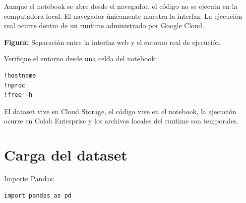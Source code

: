 \documentclass[
  coursetitle={Cómputo Nube y Tecnologías Emergentes},
  coursehours={96},
  coursedate={Verano 2026},
  doctype={Tutorial},
  otherlangs={english,french},
  authorname={Lázaro},
  authorsurname={Bustio-Martínez},
  authortitle={PhD},
  role={Profesor Investigador},
  email={lbustio@inaoe.mx},
  phone={5559504000},
  ext={7459},
  institution={Instituto Nacional de Astrofísica, Óptica y Electrónica (INAOE)},
  department={Maestría en Ciencias en Tecnologías de Seguridad},
  address={Luis Enrique Erro 1, Sta. Ma. Tonantzintla, San Andrés Cholula, CP 72840, Puebla, México},
  margin={0.5in}
]{../../lbustio_lecture_notes}
\begin{document}
Aunque el notebook se abre desde el navegador, el código no se ejecuta en la computadora local. El navegador únicamente muestra la interfaz. La ejecución real ocurre dentro de un runtime administrado por Google Cloud.

\begin{center}

\small\textbf{Figura:} Separación entre la interfaz web y el entorno real de ejecución.
\end{center}

Verifique el entorno desde una celda del notebook:

\begin{lstlisting}
!hostname
!nproc
!free -h
\end{lstlisting}

\begin{tcolorbox}[title=Conclusión operativa]
El dataset vive en Cloud Storage, el código vive en el notebook, la ejecución ocurre en Colab Enterprise y los archivos locales del runtime son temporales.
\end{tcolorbox}

\section{Carga del dataset}

Importe Pandas:

\begin{lstlisting}
import pandas as pd
\end{lstlisting}
\end{document}
